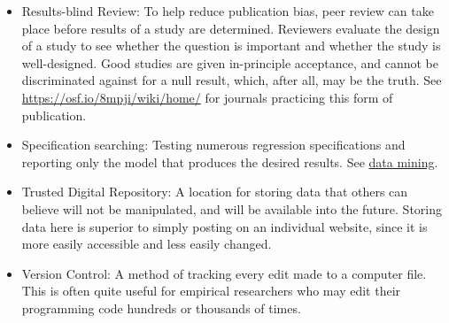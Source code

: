\documentclass[12pt] {article}
\begin{document}
\begin{itemize}
\item \label{def-rbr}
Results-blind Review: To help reduce publication bias, peer review can take place before results of a study are determined. Reviewers evaluate the design of a study to see whether the question is important and whether the study is well-designed. Good studies are given in-principle acceptance, and cannot be discriminated against for a null result, which, after all, may be the truth. See \url{https://osf.io/8mpji/wiki/home/} for journals practicing this form of publication.

\item Specification searching: Testing numerous regression specifications and reporting only the model that produces the desired results. See \hyperref[def-mining]{data mining}. 
\item
Trusted Digital Repository: A location for storing data that others can believe will not be manipulated, and will be available into the future. Storing data here is superior to simply posting on an individual website, since it is more easily accessible and less easily changed.  
\item
Version Control: A method of tracking every edit made to a computer file. This is often quite useful for empirical researchers who may edit their programming code hundreds or thousands of times.
\end{itemize}
\newpage
\singlespacing


\end{document}
